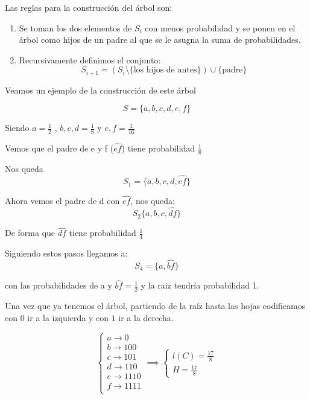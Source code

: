 Las reglas para la construcción del árbol son:
\begin{enumerate}
	\item Se toman los dos elementos de $S_i$ con menos probabilidad y se ponen en el árbol como hijos de un padre al que se le asugna la suma de probabilidades.
	\item Recursivamente definimos el conjunto:
	\[S_{i+1} = \left(S_i \setminus \{\text{los hijos de antes}\} \right)\cup \{\text{padre}\}\]
\end{enumerate}
\newpage
Veamos un ejemplo de la construcción de este árbol
\begin{example}
	$$S =\{ a, b , c, d, e , f \}$$

	Siendo $a = \frac{1}{2}$ , $b, c,d = \frac{1}{8}$ y $e, f = \frac{1}{16}$

	Vemos que el padre de e y f ($\widehat{ef}$) tiene probabilidad $\frac{1}{8}$

	Nos queda
	$$S_1 = \{a,b,c,d,\widehat{ef}\}$$


	Ahora vemos el padre de d con $\widehat{ef}$, nos queda:
	$$S_2\{ a, b,c,\widehat{df}\}$$

	De forma que $\widehat{df}$ tiene probabilidad $\frac{1}{4}$

	Siguiendo estos pasos llegamos a:
	$$S_4 = \{ a , \widehat{bf}\}$$

	con las probabilidades de a y $\widehat{bf} = \frac{1}{2}$ y la raiz tendría probabilidad 1.

	Una vez que ya tenemos el árbol, partiendo de la raíz hasta las hojas codificamos con $0$ ir a la izquierda y con $1$ ir a la derecha.

	$$\begin{cases}
	a \rightarrow 0 \\
	b \rightarrow 100 \\
	c \rightarrow 101 \\
	d \rightarrow 110 \\
	e \rightarrow 1110 \\
	f \rightarrow 1111 \\
	\end{cases} \implies \begin{cases}
	l(C) = \frac{17}{8}\\
	H = \frac{17}{8}
	\end{cases}$$
\end{example}

